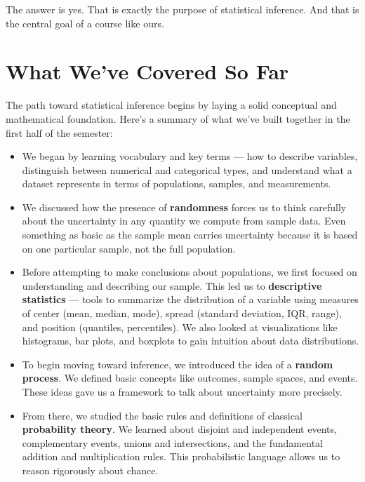 \documentclass[12pt]{article}
\begin{document}
The answer is yes. That is exactly the purpose of statistical inference. And that is the central goal of a course like ours.

\section*{What We've Covered So Far}

The path toward statistical inference begins by laying a solid conceptual and mathematical foundation. Here’s a summary of what we've built together in the first half of the semester:

\begin{itemize}[leftmargin=1.5em]
    \item We began by learning vocabulary and key terms — how to describe variables, distinguish between numerical and categorical types, and understand what a dataset represents in terms of populations, samples, and measurements.
    
    \item We discussed how the presence of \textbf{randomness} forces us to think carefully about the uncertainty in any quantity we compute from sample data. Even something as basic as the sample mean carries uncertainty because it is based on one particular sample, not the full population.
    
    \item Before attempting to make conclusions about populations, we first focused on understanding and describing our sample. This led us to \textbf{descriptive statistics} — tools to summarize the distribution of a variable using measures of center (mean, median, mode), spread (standard deviation, IQR, range), and position (quantiles, percentiles). We also looked at visualizations like histograms, bar plots, and boxplots to gain intuition about data distributions.
    
    \item To begin moving toward inference, we introduced the idea of a \textbf{random process}. We defined basic concepts like outcomes, sample spaces, and events. These ideas gave us a framework to talk about uncertainty more precisely.
    
    \item From there, we studied the basic rules and definitions of classical \textbf{probability theory}. We learned about disjoint and independent events, complementary events, unions and intersections, and the fundamental addition and multiplication rules. This probabilistic language allows us to reason rigorously about chance.
    

\end{itemize}
\end{document}

